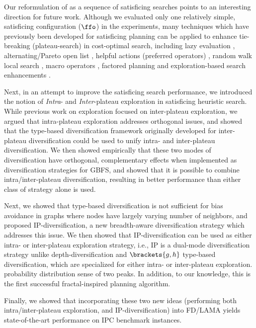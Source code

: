 Our reformulation of \astar as a sequence of satisficing searches  points to  an interesting direction for future work.
Although we evaluated only one relatively simple, satisficing configuration ($\ffo$) in
the experiments, many techniques which have previously been developed for satisficing planning can be applied to enhance tie-breaking (plateau-search) in cost-optimal search, including
lazy evaluation \cite{richter2010lama}, alternating/Pareto open
list \cite{RogerH10}, helpful actions (preferred operators) \cite{hoffmann01},
random walk local search \cite{nakhost2009monte}, macro operators
\cite{Botea2005,ChrpaVM15}, factored planning
\cite{amir2003factored,brafman2006factored,Asai2015} and
exploration-based search enhancements
\cite{valenzano2014comparison,xie14type,Valenzano2016}.


Next, in an attempt to improve the satisficing search performance,
we introduced the notion of \emph{Intra}- and
\emph{Inter}-plateau exploration in satisficing heuristic search.
While  previous work on exploration focused on inter-plateau exploration,
we argued that intra-plateau exploration addresses orthogonal issues, and showed that 
the type-based diversification framework originally developed for inter-plateau diversification could be used to unify intra- and inter-plateau diversification.
We then showed empirically that these two modes of diversification have 
orthogonal, complementary effects when implemented as diversification strategies for GBFS, %
and showed that it is possible to combine intra/inter-plateau diversification, 
resulting in better performance than either class of strategy alone is used.

Next, we showed that type-based diversification is not sufficient for
bias avoidance in graphs where nodes have largely varying number of
neighbors, and proposed IP-diversification, a new breadth-aware
diversification strategy which addresses this issue. We then showed that
IP-diversification can be used as either intra- or inter-plateau
exploration strategy, i.e., IP is a dual-mode diversification strategy
unlike depth-diversification and $\brackets{g,h}$ type-based
diversification, which are specialized for either intra- or
inter-plateau exploration. %
probability distribution sense of two peaks.  In addition, to our
knowledge, this is the first successful fractal-inspired
planning algorithm.

Finally, we showed that incorporating these two new ideas (performing
both intra/inter-plateau exploration, and IP-diversification) into
FD/LAMA yields state-of-the-art performance on IPC benchmark instances.

